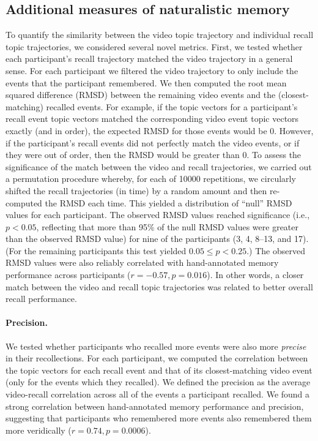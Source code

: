 \documentclass{article}
\begin{document}
\subsection*{Additional measures of naturalistic memory}
To quantify the similarity between the video topic trajectory and individual recall topic trajectories, we considered several novel metrics.  First, we tested whether each participant's recall trajectory matched the video trajectory in a general sense. For each participant we filtered the video trajectory to only include the events that the participant remembered.  We then computed the root mean squared difference (RMSD) between the remaining video events and the (closest-matching) recalled events.  For example, if the topic vectors for a participant's recall event topic vectors matched the corresponding video event topic vectors exactly (and in order), the expected RMSD for those events would be 0.  However, if the participant's recall events did not perfectly match the video events, or if they were out of order, then the RMSD would be greater than 0.  To assess the significance of the match between the video and recall trajectories, we carried out a permutation procedure whereby, for each of 10000 repetitions, we circularly shifted the recall trajectories (in time) by a random amount and then re-computed the RMSD each time.  This yielded a distribution of ``null'' RMSD values for each participant.  The observed RMSD values reached significance (i.e., $p < 0.05$, reflecting that more than 95\% of the null RMSD values were greater than the observed RMSD value) for nine of the participants (3, 4, 8--13, and 17).  (For the remaining participants this test yielded $0.05 \leq p < 0.25$.)  The observed RMSD values were also reliably correlated with hand-annotated memory performance across participants ($r = -0.57, p = 0.016$).  In other words, a closer match between the video and recall topic trajectories was related to better overall recall performance.

\paragraph*{Precision.}
We tested whether participants who recalled more events were also more \textit{precise} in their recollections. For each participant, we computed the correlation between the topic vectors for each recall event and that of its closest-matching video event (only for the events which they recalled). We defined the precision as the average video-recall correlation across all of the events a participant recalled.  We found a strong correlation between hand-annotated memory performance and precision, suggesting that participants who remembered more events also remembered them more veridically ($r = 0.74, p = 0.0006$).
\end{document}
